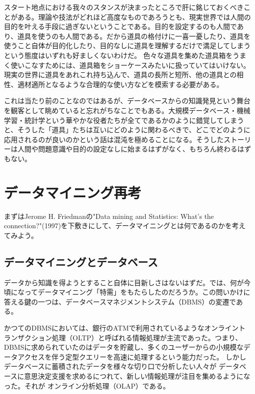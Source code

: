 スタート地点における我々のスタンスが決まったところで肝に銘じておくべきことがある。理論や技法がどれほど高度なものであろうとも、現実世界では人間の目的を叶える手段に過ぎないということである。目的を設定するのも人間であり、道具を使うのも人間である。だから道具の格付けに一喜一憂したり、道具を使うこと自体が目的化したり、目的なしに道具を理解するだけで満足してしまうという態度はいずれも好ましくないわけだ。
色々な道具を集めた道具箱をうまく使いこなすためには、道具箱をショーケースみたいに扱っていてはいけない。現実の世界に道具をあれこれ持ち込んで、道具の長所と短所、他の道具との相性、適材適所となるような合理的な使い方などを模索する必要がある。

これは当たり前のことなのではあるが、データベースからの知識発見という舞台を観客として眺めていると忘れがちなことでもある。大規模データベース・機械学習・統計学という華やかな役者たちが全てであるかのように錯覚してしまうと、そうした「道具」たちは互いにどのように関わるべきで、どこでどのように応用されるのが良いのかという話は混沌を極めることになる。そうしたストーリーは人間や問題意識や目的の設定なしに始まるはずがなく、もちろん終わるはずもない。

\section{データマイニング再考}
まずはJerome H. Friedmanの"Data mining and Statistics: What's the connection?"(1997)を下敷きにして、データマイニングとは何であるのかを考えてみよう。

\subsection{データマイニングとデータベース}
データから知識を得ようとすること自体に目新しさはないはずだ。では、何が今頃になってデータマイニング「特需」をもたらしたのだろうか。この問いかけに答える鍵の一つは、データベースマネジメントシステム（DBMS）の変遷である。

かつてのDBMSにおいては、銀行のATMで利用されているようなオンライントランザクション処理（OLTP）と呼ばれる情報処理が主流であった。つまり、DBMSに求められていたのはデータを貯蔵し、多くのユーザーからの小規模なデータアクセスを伴う定型クエリーを高速に処理するという能力だった。
しかしデータベースに蓄積されたデータを様々な切り口で分析したい人々が
データベースに意思決定支援を求めるにつれて、新しい情報処理が注目を集めるようになった。それが
オンライン分析処理（OLAP）である。

